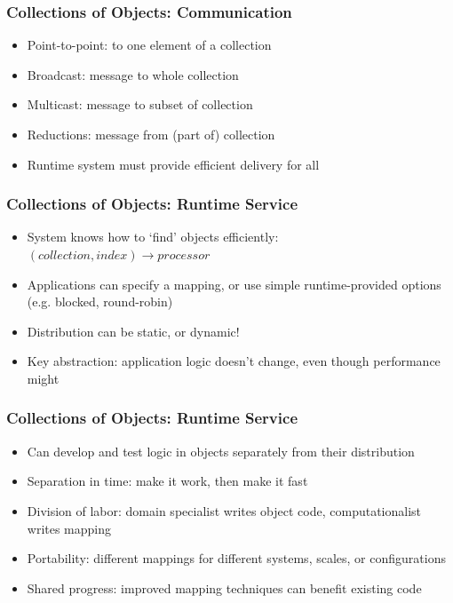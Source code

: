 \begin{frame}[fragile]
  \frametitle{Collections of Objects: Communication}
  \begin{itemize}
    \item Point-to-point: to one element of a collection
    \item Broadcast: message to whole collection
    \item Multicast: message to subset of collection
    \item Reductions: message from (part of) collection
    \item Runtime system must provide efficient delivery for all
  \end{itemize}
\end{frame}

\begin{frame}[fragile]
  \frametitle{Collections of Objects: Runtime Service}
  \begin{itemize}
    \item System knows how to `find' objects efficiently: $(collection, index) \to processor$
    \item Applications can specify a mapping, or use simple
      runtime-provided options (e.g. blocked, round-robin)
    \item Distribution can be static, or dynamic!
    \item Key abstraction: application logic doesn't change, even
      though performance might
  \end{itemize}
\end{frame}

\begin{frame}[fragile]
  \frametitle{Collections of Objects: Runtime Service}
  \begin{itemize}
    \item Can develop and test logic in objects separately from their distribution
    \item Separation in time: make it work, then make it fast
    \item Division of labor: domain specialist writes object code, computationalist writes mapping
    \item Portability: different mappings for different systems, scales, or configurations
    \item Shared progress: improved mapping techniques can benefit existing code
  \end{itemize}
\end{frame}

